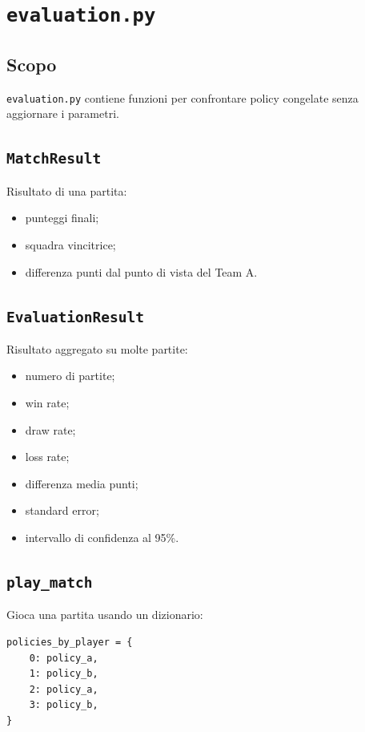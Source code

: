 \documentclass[11pt,a4paper]{article}
\begin{document}
\section{\texttt{evaluation.py}}

\subsection{Scopo}

\texttt{evaluation.py} contiene funzioni per confrontare policy congelate senza
aggiornare i parametri.

\subsection{\texttt{MatchResult}}

Risultato di una partita:

\begin{itemize}
  \item punteggi finali;
  \item squadra vincitrice;
  \item differenza punti dal punto di vista del Team A.
\end{itemize}

\subsection{\texttt{EvaluationResult}}

Risultato aggregato su molte partite:

\begin{itemize}
  \item numero di partite;
  \item win rate;
  \item draw rate;
  \item loss rate;
  \item differenza media punti;
  \item standard error;
  \item intervallo di confidenza al 95\%.
\end{itemize}

\subsection{\texttt{play\_match}}

Gioca una partita usando un dizionario:

\begin{verbatim}
policies_by_player = {
    0: policy_a,
    1: policy_b,
    2: policy_a,
    3: policy_b,
}
\end{verbatim}
\end{document}
